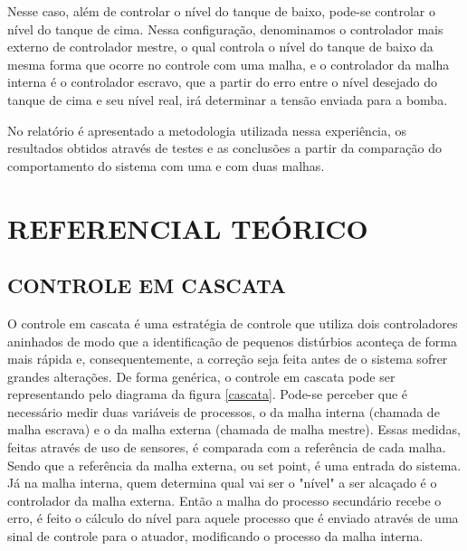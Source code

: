 \documentclass[a4paper,12pt]{article}
\begin{document}
\hspace{4ex}Nesse caso, além de controlar o nível do tanque de baixo, pode-se controlar o nível do tanque de cima. Nessa configuração, denominamos o controlador mais externo de controlador mestre, o qual controla o nível do tanque de baixo da mesma forma que ocorre no controle com uma malha, e o controlador da malha interna é o controlador escravo, que a partir do erro entre o nível desejado do tanque de cima e seu nível real, irá determinar a tensão enviada para a bomba.

\hspace{4ex}No relatório é apresentado a metodologia utilizada nessa experiência, os resultados obtidos através de testes e as conclusões a partir da comparação do comportamento do sistema com uma e com duas malhas.


\newpage


\thispagestyle{main}

\section{REFERENCIAL TEÓRICO}

\subsection{CONTROLE EM CASCATA}
\hspace{4ex}O controle em cascata é uma estratégia de controle que utiliza dois controladores aninhados de modo que a identificação de pequenos distúrbios aconteça de forma mais rápida e, consequentemente, a correção seja feita antes de o sistema sofrer grandes alterações. De forma genérica, o controle em cascata pode ser representando pelo diagrama da figura \ref{cascata}. Pode-se perceber que é necessário medir duas variáveis de processos, o da malha interna (chamada de malha escrava) e o da malha externa (chamada de malha mestre). Essas medidas, feitas através de uso de sensores, é comparada com a referência de cada malha. Sendo que a referência da malha externa, ou set point, é uma entrada do sistema. Já na malha interna, quem determina qual vai ser o "nível" a ser alcaçado é o controlador da malha externa. Então a malha do processo secundário recebe o erro, é feito o cálculo do nível para aquele processo que é enviado através de uma sinal de controle para o atuador, modificando o processo da malha interna.     
\end{document}
